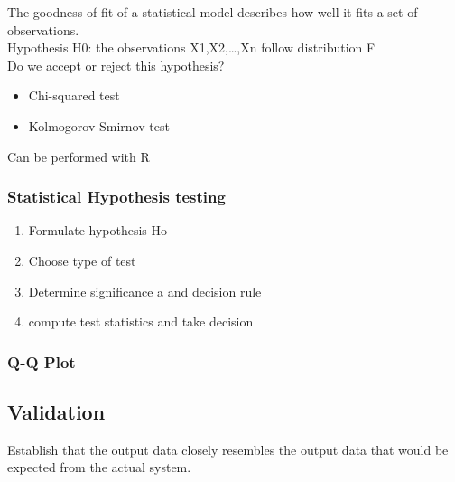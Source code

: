 \documentclass[11pt,a4paper]{article}
\begin{document}
The goodness of fit of a statistical model describes how well it fits a set of observations.\\
Hypothesis H0: the observations X1,X2,…,Xn follow distribution F\\
Do we accept or reject this hypothesis?

\begin{itemize}
\item Chi-squared test
\item Kolmogorov-Smirnov test
\end{itemize}
Can be performed with R

\subsubsection{ Statistical Hypothesis testing}
\begin{enumerate}
\item Formulate hypothesis Ho
\item Choose type of test
\item Determine significance a and decision rule
\item compute test statistics and take decision
\end{enumerate}

\subsubsection{ Q-Q Plot}


\subsection{Validation}
Establish that the output data closely resembles the output data that would be expected from the actual system. 
\end{document}
